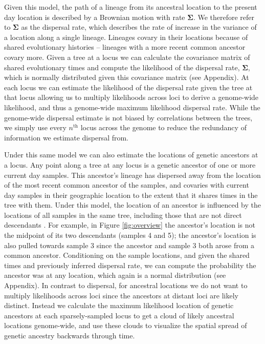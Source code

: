 \documentclass[12pt]{article}
\begin{document}
Given this model, the path of a lineage from its ancestral location to the present day location is described by a Brownian motion with rate $\mathbf{\Sigma}$.
We therefore refer to $\mathbf{\Sigma}$ as the dispersal rate, which describes the rate of increase in the variance of a location along a single lineage.
Lineages covary in their locations because of shared evolutionary histories -- lineages with a more recent common ancestor covary more.
Given a tree at a locus we can calculate the covariance matrix of shared evolutionary times and compute the likelihood of the dispersal rate, $\mathbf{\Sigma}$, which is normally distributed given this covariance matrix (see Appendix).
At each locus we can estimate the likelihood of the dispersal rate given the tree at that locus allowing us to multiply likelihoods across loci to derive a genome-wide likelihood, and thus a genome-wide maximum likelihood dispersal rate.
While the genome-wide dispersal estimate is not biased by correlations between the trees, we simply use every $n^{\mathrm{th}}$ locus across the genome to reduce the redundancy of information we estimate dispersal from.

Under this same model we can also estimate the locations of genetic ancestors at a locus.
Any point along a tree at any locus is a genetic ancestor of one or more current day samples. 
This ancestor's lineage has dispersed away from the location of the most recent common ancestor of the samples, and covaries with current day samples in their geographic location to the extent that it shares times in the tree with them.
Under this model, the location of an ancestor is influenced by the locations of all samples in the same tree, including those that are not direct descendants \citep[cf.][]{wohns2021unified}.
For example, in Figure \ref{fig:overview} the ancestor's location is not the midpoint of its two descendants (samples 4 and 5); the ancestor's location is also pulled towards sample 3 since the ancestor and sample 3 both arose from a common ancestor.
Conditioning on the sample locations, and given the shared times and previously inferred dispersal rate, we can compute the probability the ancestor was at any location, which again is a normal distribution (see Appendix). 
In contrast to dispersal, for ancestral locations we do not want to multiply likelihoods across loci since the ancestors at distant loci are likely distinct.
Instead we calculate the maximum likelihood location of genetic ancestors at each sparsely-sampled locus to get a cloud of likely ancestral locations genome-wide, and use these clouds to visualize the spatial spread of genetic ancestry backwards through time.
\end{document}
